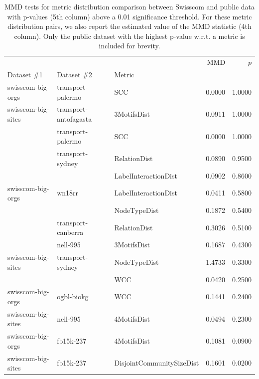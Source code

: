 \begin{table}[ht!]
    \centering
        \caption[MMD tests for metric distribution comparison between Swisscom and public data.]{MMD tests for metric distribution comparison between Swisscom and public data with p-values (5th column) above a 0.01 significance threshold. For these metric distribution pairs, we also report the estimated value of the MMD statistic (4th column). Only the public dataset with the highest p-value w.r.t. a metric is included for brevity.}
    \label{tab:mmd}
\begin{adjustbox}{width=0.8\columnwidth}
\begin{tabular}{lllrr}
\toprule
                   &           &                           &    MMD &  $p$ \\
Dataset \#1 & Dataset \#2 & Metric &        &            \\
\midrule
swisscom-big-orgs & transport-palermo & SCC & 0.0000 &     1.0000 \\
swisscom-big-sites & transport-antofagasta & 3MotifsDist & 0.0911 &     1.0000 \\
                   & transport-palermo & SCC & 0.0000 &     1.0000 \\
                   & transport-sydney & RelationDist & 0.0890 &     0.9500 \\
                   &           & LabelInteractionDist & 0.0902 &     0.8600 \\
swisscom-big-orgs & wn18rr & LabelInteractionDist & 0.0411 &     0.5800 \\
                   &           & NodeTypeDist & 0.1872 &     0.5400 \\
                   & transport-canberra & RelationDist & 0.3026 &     0.5100 \\
                   & nell-995 & 3MotifsDist & 0.1687 &     0.4300 \\
swisscom-big-sites & transport-sydney & NodeTypeDist & 1.4733 &     0.3300 \\
                   &           & WCC & 0.0420 &     0.2500 \\
swisscom-big-orgs & ogbl-biokg & WCC & 0.1441 &     0.2400 \\
swisscom-big-sites & nell-995 & 4MotifsDist & 0.0494 &     0.2300 \\
swisscom-big-orgs & fb15k-237 & 4MotifsDist & 0.1081 &     0.0900 \\
swisscom-big-sites & fb15k-237 & DisjointCommunitySizeDist & 0.1601 &     0.0200 \\
\bottomrule
\end{tabular}
\end{adjustbox}
\end{table}

